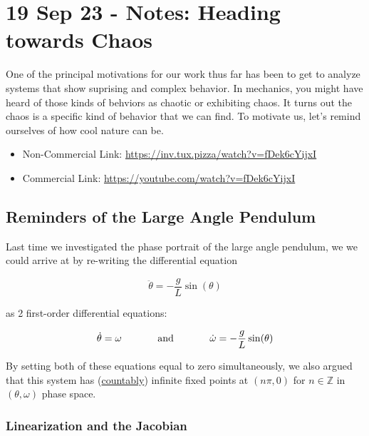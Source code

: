 \section{19 Sep 23 - Notes: Heading towards
Chaos}\label{sep-23---notes-heading-towards-chaos}

One of the principal motivations for our work thus far has been to get
to analyze systems that show suprising and complex behavior. In
mechanics, you might have heard of those kinds of behviors as chaotic or
exhibiting chaos. It turns out the chaos is a specific kind of behavior
that we can find. To motivate us, let's remind ourselves of how cool
nature can be.

\href{https://inv.tux.pizza/watch?v=fDek6cYijxI}{\pandocbounded{\texttt{[image: https://markdown-videos-api.jorgenkh.no/youtube/fDek6cYijxI?width=720\&height=405]}}}

\begin{itemize}
\tightlist
\item
  Non-Commercial Link: \url{https://inv.tux.pizza/watch?v=fDek6cYijxI}
\item
  Commercial Link: \url{https://youtube.com/watch?v=fDek6cYijxI}
\end{itemize}

\subsection{Reminders of the Large Angle
Pendulum}\label{reminders-of-the-large-angle-pendulum}

Last time we investigated the phase portrait of the large angle
pendulum, we we could arrive at by re-writing the differential equation

\[
\ddot{\theta} = -\dfrac{g}{L}\sin(\theta)
\]

as 2 first-order differential equations:

\[
\dot{\theta} = \omega \hspace{0.5in}\text{and}\hspace{0.5in} \dot{\omega} = -\frac{g}{L}\sin(\theta)
\]

By setting both of these equations equal to zero simultaneously, we also
argued that this system has
(\href{https://faculty.math.illinois.edu/~kapovich/417-16/card.pdf}{countably})
infinite fixed points at \((n\pi, 0)\) for \(n\in \mathbb{Z}\) in
\((\theta,\omega)\) phase space.

\subsubsection{Linearization and the
Jacobian}\label{linearization-and-the-jacobian}

